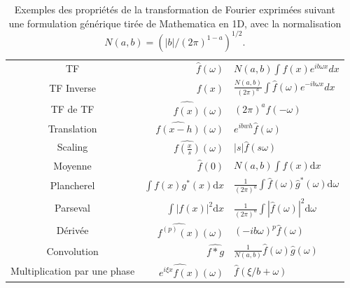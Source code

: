 \documentclass[11pt,twoside]{article}
\begin{document}
\begin{table}
\centering
{\renewcommand{\arraystretch}{2}
\begin{tabular}{cr@{\ =\ }l}
\toprule
TF & $\displaystyle\hat{f}(\omega)$ & $\displaystyle N(a,b)\int f(x) e^{i b \omega x} dx$\\
TF Inverse & $\displaystyle f(x)$ &$\displaystyle \frac{N(a,b)}{(2\pi)^a} \int \hat{f}(\omega) e^{-i b \omega x} dx$\\
TF de TF & $\widehat{\displaystyle \hat{f}(x)}(\omega)$ & $(2\pi)^a f(-\omega)$ \\
Translation & $\displaystyle\widehat{f(x-h)}(\omega)$ & $\displaystyle e^{ibw h}\hat{f}(\omega)$\\
Scaling  & $\displaystyle\widehat{f(\frac{x}{s})}(\omega)$ & $|s|\hat{f}(s\omega)$\\
Moyenne & $\displaystyle \hat{f}(0)$ & $\displaystyle N(a,b)\int f(x) \mathrm{d}x$\\
Plancherel & $\displaystyle \int f(x) g^\ast(x) \mathrm{d}x$ & $\displaystyle \frac{1}{(2\pi)^a} \int \hat{f}(\omega) \hat{g}^\ast(\omega) \mathrm{d}\omega $\\
Parseval & $\displaystyle \int |f(x)|^2 \mathrm{d}x$ & $\displaystyle \frac{1}{(2\pi)^a} \int |\hat{f}(\omega)|^2 \mathrm{d}\omega $\\
Dérivée & $\displaystyle \widehat{f^{(p)}(x)}(\omega)$ & $\displaystyle (-i b\omega)^p \hat{f}(\omega)$\\
Convolution & $\displaystyle \widehat{f\ast g}$ & $\displaystyle \frac{1}{N(a,b)} \hat{f}(\omega) \hat{g}(\omega)$\\
Multiplication par une phase & $\displaystyle \widehat{e^{i\xi x}f(x)}(\omega)$ & $\displaystyle \hat{f}(\xi/b +\omega) $\\
\bottomrule
\end{tabular}
}
\caption{Exemples des propriétés de la transformation de Fourier exprimées suivant une formulation générique tirée de Mathematica en 1D, avec la normalisation $N(a,b)=(|b|/(2\pi)^{1-a})^{1/2}$.}
\label{tag-2020-TFconv}
\end{table} 
%
\newpage
\end{document}
